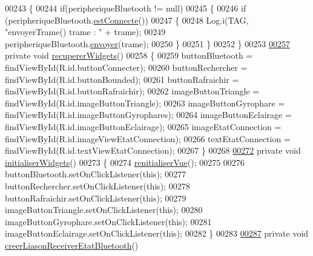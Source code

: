\begin{DoxyCode}
00243     \{
00244         \textcolor{keywordflow}{if}(peripheriqueBluetooth != null)
00245         \{
00246             \textcolor{keywordflow}{if} (peripheriqueBluetooth.\hyperlink{classcom_1_1lasalle_1_1io__trucks_1_1_peripherique_a53878a13cdb7b3d8fa8e7c97cb0287f0}{estConnecte}())
00247             \{
00248                 Log.i(TAG, \textcolor{stringliteral}{"envoyerTrame() trame : "} + trame);
00249                 peripheriqueBluetooth.\hyperlink{classcom_1_1lasalle_1_1io__trucks_1_1_peripherique_a7f691381f5164b92f8ff3f06561db656}{envoyer}(trame);
00250             \}
00251         \}
00252     \}
00253 
\hyperlink{classcom_1_1lasalle_1_1io__trucks_1_1_main_activity_a36109f04e626f0bf4c1a73da14c4fb2b}{00257}     \textcolor{keyword}{private} \textcolor{keywordtype}{void} \hyperlink{classcom_1_1lasalle_1_1io__trucks_1_1_main_activity_a36109f04e626f0bf4c1a73da14c4fb2b}{recupererWidgets}()
00258     \{
00259         buttonBluetooth = findViewById(R.id.buttonConnecter);
00260         buttonRechercher = findViewById(R.id.buttonBounded);
00261         buttonRafraichir = findViewById(R.id.buttonRafraichir);
00262         imageButtonTriangle = findViewById(R.id.imageButtonTriangle);
00263         imageButtonGyrophare = findViewById(R.id.imageButtonGyrophares);
00264         imageButtonEclairage = findViewById(R.id.imageButtonEclairage);
00265         imageEtatConnection = findViewById(R.id.imageViewEtatConnection);
00266         textEtatConnection = findViewById(R.id.textViewEtatConnection);
00267     \}
00268 
\hyperlink{classcom_1_1lasalle_1_1io__trucks_1_1_main_activity_a6c15e67f7d99f62d1e40de710216a1d7}{00272}     \textcolor{keyword}{private} \textcolor{keywordtype}{void} \hyperlink{classcom_1_1lasalle_1_1io__trucks_1_1_main_activity_a6c15e67f7d99f62d1e40de710216a1d7}{initialiserWidgets}()
00273     \{
00274         \hyperlink{classcom_1_1lasalle_1_1io__trucks_1_1_main_activity_ac4c0bdaf761a42e924c6cf9d1b9a0e23}{renitialiserVue}();
00275 
00276         buttonBluetooth.setOnClickListener(\textcolor{keyword}{this});
00277         buttonRechercher.setOnClickListener(\textcolor{keyword}{this});
00278         buttonRafraichir.setOnClickListener(\textcolor{keyword}{this});
00279         imageButtonTriangle.setOnClickListener(\textcolor{keyword}{this});
00280         imageButtonGyrophare.setOnClickListener(\textcolor{keyword}{this});
00281         imageButtonEclairage.setOnClickListener(\textcolor{keyword}{this});
00282     \}
00283 
\hyperlink{classcom_1_1lasalle_1_1io__trucks_1_1_main_activity_a14d1db05fdfec7536d6b7c9809e360a0}{00287}     \textcolor{keyword}{private} \textcolor{keywordtype}{void} \hyperlink{classcom_1_1lasalle_1_1io__trucks_1_1_main_activity_a14d1db05fdfec7536d6b7c9809e360a0}{creerLiasonReceiverEtatBluetooth}()

\end{DoxyCode}
